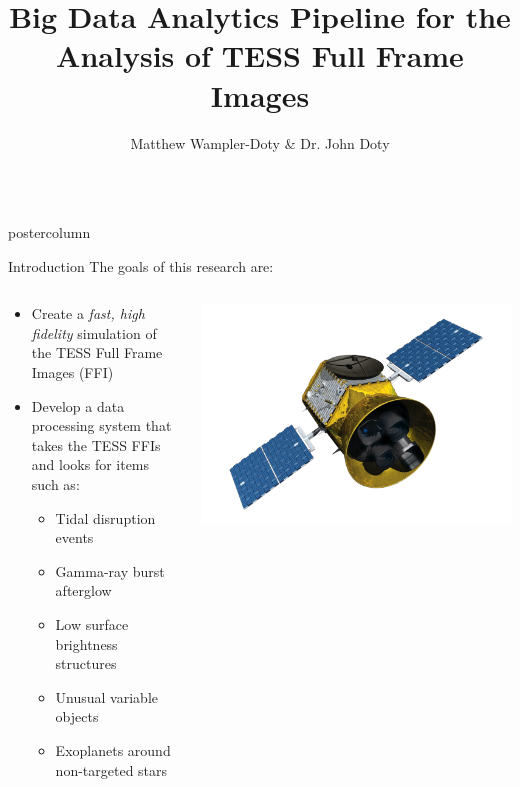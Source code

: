 \documentclass[final,hyperref={pdfpagelabels=false}]{beamer}
\title{\LARGE Big Data Analytics Pipeline for the Analysis of TESS Full Frame Images}
\author{Matthew Wampler-Doty \& Dr. John Doty}
\institute[Noqsi Aerospace]{Noqsi Aerospace, Ltd. \& MIT}
\date[]{}
\newlength{\columnheight}
\begin{document}
\begin{frame}
  \begin{columns}
    \begin{column}{.49\textwidth}
      \begin{beamercolorbox}[center,wd=\textwidth]{postercolumn}
        \begin{minipage}[T]{.95\textwidth}  %
          \parbox[t][\columnheight]{\textwidth}{
            \begin{block}{Introduction}
	    The goals of this research are:
            \begin{columns}
	            \begin{column}{.70\textwidth}
		              \begin{itemize}
		              \item Create a \emph{fast, high fidelity} simulation of the TESS Full Frame Images (FFI)
		              \item Develop a data processing system that takes the TESS FFIs and looks for items such as:
		              \begin{itemize}
		              	\item Tidal disruption events
			        \item Gamma-ray burst afterglow
				\item Low surface brightness structures
				\item Unusual variable objects
				\item Exoplanets around non-targeted stars
		              \end{itemize}
		              \end{itemize}
		     \end{column}
		     \begin{column}{.28\textwidth}
		     \includegraphics[width=0.80\linewidth]{figures/TESS.png}
		     \end{column}         
              \end{columns}
            \end{block}

}
\end{minipage}
\end{beamercolorbox}
\end{column}
\end{columns}
\end{frame}
\end{document}
